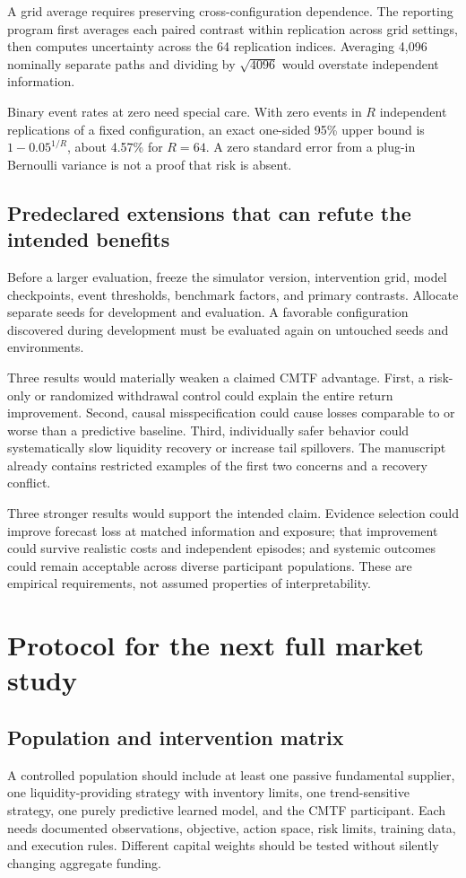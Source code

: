 A grid average requires preserving cross-configuration dependence. The reporting program first averages each paired contrast within replication across grid settings, then computes uncertainty across the 64 replication indices. Averaging 4,096 nominally separate paths and dividing by $\sqrt{4096}$ would overstate independent information.

Binary event rates at zero need special care. With zero events in $R$ independent replications of a fixed configuration, an exact one-sided 95\% upper bound is $1-0.05^{1/R}$, about 4.57\% for $R=64$. A zero standard error from a plug-in Bernoulli variance is not a proof that risk is absent.

\subsection{Predeclared extensions that can refute the intended benefits}
Before a larger evaluation, freeze the simulator version, intervention grid, model checkpoints, event thresholds, benchmark factors, and primary contrasts. Allocate separate seeds for development and evaluation. A favorable configuration discovered during development must be evaluated again on untouched seeds and environments.

Three results would materially weaken a claimed CMTF advantage. First, a risk-only or randomized withdrawal control could explain the entire return improvement. Second, causal misspecification could cause losses comparable to or worse than a predictive baseline. Third, individually safer behavior could systematically slow liquidity recovery or increase tail spillovers. The manuscript already contains restricted examples of the first two concerns and a recovery conflict.

Three stronger results would support the intended claim. Evidence selection could improve forecast loss at matched information and exposure; that improvement could survive realistic costs and independent episodes; and systemic outcomes could remain acceptable across diverse participant populations. These are empirical requirements, not assumed properties of interpretability.

\section{Protocol for the next full market study}
\subsection{Population and intervention matrix}
A controlled population should include at least one passive fundamental supplier, one liquidity-providing strategy with inventory limits, one trend-sensitive strategy, one purely predictive learned model, and the CMTF participant. Each needs documented observations, objective, action space, risk limits, training data, and execution rules. Different capital weights should be tested without silently changing aggregate funding.

